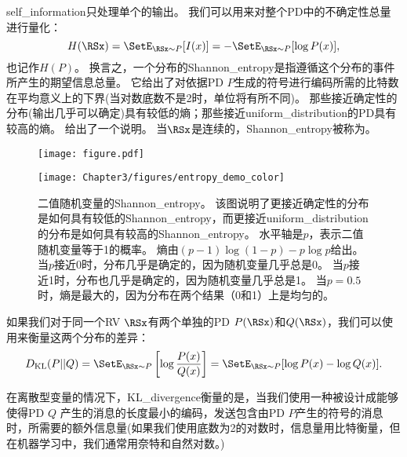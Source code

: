 \gls{self_information}只处理单个的输出。
我们可以用来对整个\gls{PD}中的不确定性总量进行量化：
\begin{equation}
H(\RSx) = \SetE_{\RSx \sim P}[I(x)] = -\SetE_{\RSx \sim P}[\log P(x)],
\end{equation}
也记作$H(P)$。
换言之，一个分布的\gls{Shannon_entropy}是指遵循这个分布的事件所产生的期望信息总量。
它给出了对依据\gls{PD} $P$生成的符号进行编码所需的比特数在平均意义上的下界(当对数底数不是2时，单位将有所不同)。
那些接近确定性的分布(输出几乎可以确定)具有较低的熵；那些接近\gls{uniform_distribution}的\gls{PD}具有较高的熵。
给出了一个说明。
当$\RSx$是连续的，\gls{Shannon_entropy}被称为。
\begin{figure}[!htb]
\ifOpenSource
\centerline{\texttt{[image: figure.pdf]}}
\else
\centerline{\texttt{[image: Chapter3/figures/entropy\_demo\_color]}}
\fi
\captionsetup{singlelinecheck=off}
\caption{二值随机变量的\gls{Shannon_entropy}。%
该图说明了更接近确定性的分布是如何具有较低的\gls{Shannon_entropy}，而更接近\gls{uniform_distribution}的分布是如何具有较高的\gls{Shannon_entropy}。
水平轴是$p$，表示二值随机变量等于1的概率。
熵由$(p-1)\log(1-p) - p\log p$给出。
当$p$接近0时，分布几乎是确定的，因为随机变量几乎总是0。
当$p$接近1时，分布也几乎是确定的，因为随机变量几乎总是1。
当$p = 0.5$时，熵是最大的，因为分布在两个结果（0和1）上是均匀的。}
\label{fig:chap3_entropy_demo_color}
\end{figure}



如果我们对于同一个\gls{RV} $\RSx$有两个单独的\gls{PD} $P(\RSx)$和$Q(\RSx)$，我们可以使用来衡量这两个分布的差异：
\begin{equation}
D_{\text{KL}}(P||Q) = \SetE_{\RSx \sim P} \left [  \log \frac{P(x)}{Q(x)} \right ] = \SetE_{\RSx \sim P} [\log P(x) - \log Q(x)].
\end{equation}

在离散型变量的情况下，\gls{KL_divergence}衡量的是，当我们使用一种被设计成能够使得\gls{PD} $Q$ 产生的消息的长度最小的编码，发送包含由\gls{PD} $P$产生的符号的消息时，所需要的额外信息量(如果我们使用底数为2的对数时，信息量用比特衡量，但在机器学习中，我们通常用奈特和自然对数。)

